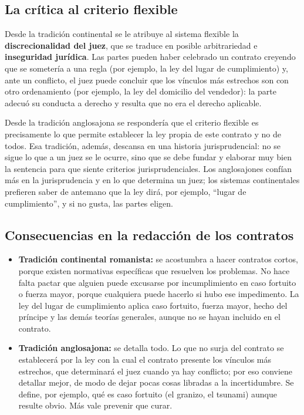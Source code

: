 \documentclass[12pt,oneside]{book}
\begin{document}
\subsection{La crítica al criterio flexible}

Desde la tradición continental se le atribuye al sistema flexible la \textbf{discrecionalidad del juez}, que se traduce en posible arbitrariedad e \textbf{inseguridad jurídica}. Las partes pueden haber celebrado un contrato creyendo que se sometería a una regla (por ejemplo, la ley del lugar de cumplimiento) y, ante un conflicto, el juez puede concluir que los vínculos más estrechos son con otro ordenamiento (por ejemplo, la ley del domicilio del vendedor): la parte adecuó su conducta a derecho y resulta que no era el derecho aplicable.

Desde la tradición anglosajona se respondería que el criterio flexible es precisamente lo que permite establecer la ley propia de este contrato y no de todos. Esa tradición, además, descansa en una historia jurisprudencial: no se sigue lo que a un juez se le ocurre, sino que se debe fundar y elaborar muy bien la sentencia para que siente criterios jurisprudenciales. Los anglosajones confían más en la jurisprudencia y en lo que determina un juez; los sistemas continentales prefieren saber de antemano que la ley dirá, por ejemplo, ``lugar de cumplimiento'', y si no gusta, las partes eligen.

\subsection{Consecuencias en la redacción de los contratos}

\begin{itemize}
    \item \textbf{Tradición continental romanista:} se acostumbra a hacer contratos cortos, porque existen normativas específicas que resuelven los problemas. No hace falta pactar que alguien puede excusarse por incumplimiento en caso fortuito o fuerza mayor, porque cualquiera puede hacerlo si hubo ese impedimento. La ley del lugar de cumplimiento aplica caso fortuito, fuerza mayor, hecho del príncipe y las demás teorías generales, aunque no se hayan incluido en el contrato.
    \item \textbf{Tradición anglosajona:} se detalla todo. Lo que no surja del contrato se establecerá por la ley con la cual el contrato presente los vínculos más estrechos, que determinará el juez cuando ya hay conflicto; por eso conviene detallar mejor, de modo de dejar pocas cosas libradas a la incertidumbre. Se define, por ejemplo, qué es caso fortuito (el granizo, el tsunami) aunque resulte obvio. Más vale prevenir que curar.
\end{itemize}
\end{document}
